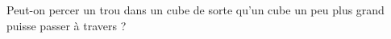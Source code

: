 Peut-on percer un trou dans un cube de sorte qu'un cube un peu plus grand puisse passer à travers ?
